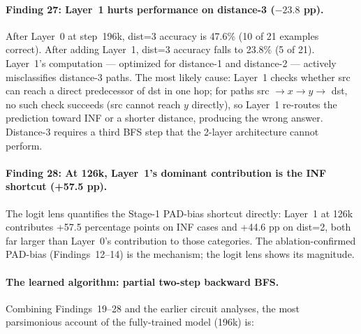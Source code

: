 \documentclass[11pt, a4paper]{article}
\begin{document}
\paragraph{Finding 27: Layer~1 hurts performance on distance-3 ($-23.8$ pp).}
After Layer~0 at step~196k, dist=3 accuracy is 47.6\% (10 of 21 examples
correct).  After adding Layer~1, dist=3 accuracy falls to 23.8\% (5 of 21).
Layer~1's computation --- optimized for distance-1 and distance-2 ---
actively misclassifies distance-3 paths.  The most likely cause: Layer~1
checks whether src can reach a direct predecessor of dst in one hop; for
paths src $\to x \to y \to$ dst, no such check succeeds (src cannot reach $y$
directly), so Layer~1 re-routes the prediction toward INF or a shorter
distance, producing the wrong answer.  Distance-3 requires a third BFS step
that the 2-layer architecture cannot perform.

\paragraph{Finding 28: At 126k, Layer~1's dominant contribution is the INF
shortcut (+57.5 pp).}
The logit lens quantifies the Stage-1 PAD-bias shortcut directly: Layer~1 at
126k contributes +57.5 percentage points on INF cases and +44.6 pp on dist=2,
both far larger than Layer~0's contribution to those categories.  The
ablation-confirmed PAD-bias (Findings~12--14) is the mechanism; the logit lens
shows its magnitude.

\paragraph{The learned algorithm: partial two-step backward BFS.}
Combining Findings~19--28 and the earlier circuit analyses, the most
parsimonious account of the fully-trained model (196k) is:
\end{document}
